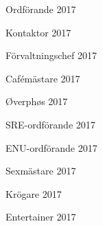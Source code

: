 \documentclass[../_main/handlingar.tex]{subfiles}
\begin{document}
\newpage
\begin{signatures}{10}
    \mvh
    \signature{Erik Månsson}{Ordförande 2017}
    \signature{Johan Karlberg}{Kontaktor 2017}
    \signature{Sophia Grimmeiss Grahm}{Förvaltningschef 2017}
    \signature{Daniel Bakic}{Cafémästare 2017}
    \signature{Niklas Gustafson}{Øverphøs 2017}
    \signature{Pontus Landgren}{SRE-ordförande 2017}
    \signature{Josefine Sandström}{ENU-ordförande 2017}
    \signature{Linnea Sjödahl}{Sexmästare 2017}
    \signature{Markus Rahne}{Krögare 2017}
    \signature{Albin Nyström Eklund}{Entertainer 2017}
\end{signatures}
\end{document}
